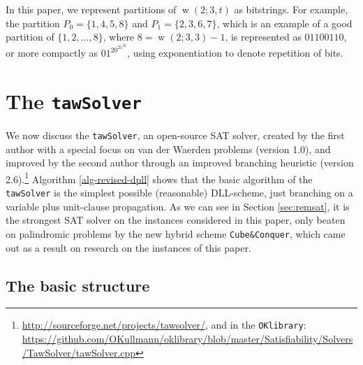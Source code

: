 \documentclass[final,3p,times]{elsarticle}
\theoremstyle{definition}
\newcommand{\set}[1]{\{#1\}}
\newcommand{\tawsolver}{\texttt{tawSolver}}
\newcommand{\cubeconq}{\texttt{Cube\:\&\:Conquer}}
\DeclareMathOperator{\vdw}{w}
\begin{document}
In this paper, we represent partitions of $\vdw(2; 3, t)$ as bitstrings.
For example, the partition $P_0=\set{1,4,5,8}$ and $P_1=\set{2,3,6,7}$, which is an example of a good partition of $\set{1,2,\dots,8}$, where $8 = \vdw(2; 3, 3)-1$, is represented as $01100110$, or more compactly as $01^20^21^20$, using exponentiation to denote repetition of bits.



\section{The \tawsolver}
\label{sec:tawsolver}

We now discuss the \tawsolver, an open-source SAT solver, created by the first author with a special focus on van der Waerden problems (version 1.0), and improved by the second author through an improved branching heuristic (version 2.6).\footnote{\url{http://sourceforge.net/projects/tawsolver/}, and in the \texttt{OKlibrary}:\\\url{https://github.com/OKullmann/oklibrary/blob/master/Satisfiability/Solvers/TawSolver/tawSolver.cpp}} Algorithm \ref{alg-revised-dpll} shows that the basic algorithm of the \tawsolver{} is the simplest possible (reasonable) DLL-scheme, just branching on a variable plus unit-clause propagation. As we can see in Section \ref{sec:remsat}, it is the strongest SAT solver on the instances considered in this paper, only beaten on palindromic problems by the new hybrid scheme \cubeconq, which came out as a result on research on the instances of this paper.


\subsection{The basic structure}
\label{sec:tawsbasic}
\end{document}
